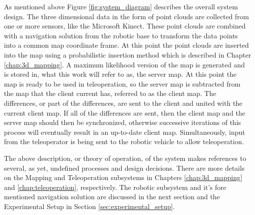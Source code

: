 \documentclass[12pt]{report}
\begin{document}
As mentioned above Figure \ref{fig:system_diagram} describes the overall system design.  The three dimensional data in the form of point clouds are collected from one or more sensors, like the Microsoft Kinect.  These point clouds are combined with a navigation solution from the robotic base to transform the data points into a common map coordinate frame.  At this point the point clouds are inserted into the map using a probabilistic insertion method which is described in Chapter \ref{chap:3d_mapping}.  A maximum likelihood version of the map is generated and is stored in, what this work will refer to as, the server map.  At this point the map is ready to be used in teleoperation, so the server map is subtracted from the map that the client current has, referred to as the client map.  The differences, or part of the differences, are sent to the client and united with the current client map.  If all of the differences are sent, then the client map and the server map should then be synchronized, otherwise successive iterations of this process will eventually result in an up-to-date client map.  Simultaneously, input from the teleoperator is being sent to the robotic vehicle to allow teleoperation.

The above description, or theory of operation, of the system makes references to several, as yet, undefined processes and design decisions.  There are more details on the Mapping and Teleoperation subsystems in Chapters \ref{chap:3d_mapping} and \ref{chap:teleoperation}, respectively.  The robotic subsystem and it's fore mentioned navigation solution are discussed in the next section and the Experimental Setup in Section \ref{sec:experimental_setup}.
\end{document}
